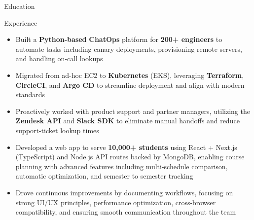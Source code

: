 \documentclass{resume}
\begin{document}
\introduction[
    fullname={Declan Blanchard},
    email={declanblanc@gmail.com},
    linkedin={linkedin.com/in/declanblanc},
    github={github.com/declanblanc}
]

\begin{educationSection}{Education}
    \educationItem[
        university={New Jersey Institute of Technology},
        graduation={May 2026},
        grade={3.8 GPA},
        program={Bachelor's, Computer Science}
    ]
\end{educationSection}

\begin{experienceSection}{Experience}


    \experienceItem[
        company={Patreon},
        location={New York, NY},
        position={Software Engineer Intern},
        duration={May 2025 - August 2025}
    ]
    \begin{itemize}[itemsep=-6pt, leftmargin=2em, rightmargin=0.8em, before=\raggedright, after=\normalfont]
        \item Built a \textbf{Python-based} \textbf{ChatOps} platform for \textbf{200+ engineers} to automate tasks including canary deployments, provisioning remote servers, and handling on-call lookups
        \item Migrated from ad-hoc EC2 to \textbf{Kubernetes} (EKS), leveraging \textbf{Terraform}, \textbf{CircleCI}, and \textbf{Argo CD} to streamline deployment and align with modern standards
        \item Proactively worked with product support and partner managers, utilizing the \textbf{Zendesk API} and \textbf{Slack SDK} to eliminate manual handoffs and reduce support-ticket lookup times 
    \end{itemize}

    \experienceItem[
        company={New Jersey Institute of Technology},
        location={Newark, NJ},
        position={Full Stack Developer},
        duration={January 2025 - Present}
    ]
    \begin{itemize}[itemsep=-6pt, leftmargin=2em, rightmargin=0.8em, before=\raggedright, after=\normalfont]
        \item Developed a web app to serve \textbf{10,000+ students} using React + Next.js (TypeScript) and Node.js API routes backed by MongoDB, enabling course planning with advanced features including multi-schedule comparison, automatic optimization, and semester to semester tracking
        \item Drove continuous improvements by documenting workflows, focusing on strong UI/UX principles, performance optimization, cross-browser compatibility, and ensuring smooth communication throughout the team
    \end{itemize}



\end{experienceSection}
\end{document}
